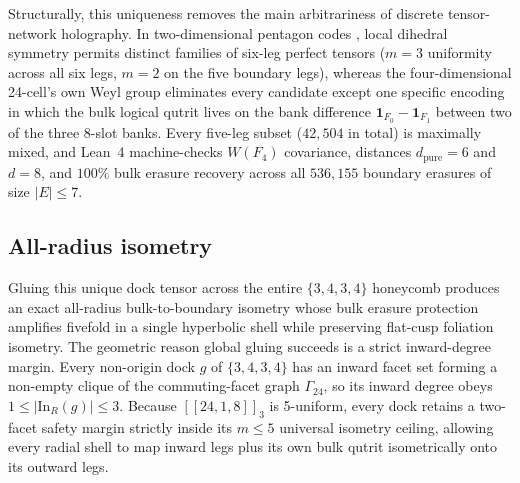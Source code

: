 Structurally, this uniqueness removes the main arbitrariness of discrete tensor-network holography. In two-dimensional
pentagon codes \cite{pastawski2015happy}, local dihedral symmetry permits distinct families of six-leg perfect tensors
($m = 3$ uniformity across all six legs, $m = 2$ on the five boundary legs), whereas the four-dimensional 24-cell's own
Weyl group eliminates every candidate except one
specific encoding in which the bulk logical qutrit lives on the bank difference $\mathbf{1}_{F_0} - \mathbf{1}_{F_1}$
between two of the three 8-slot banks. Every five-leg subset ($42{,}504$ in total) is maximally mixed, and Lean~4
machine-checks $W(F_4)$ covariance, distances $d_{\mathrm{pure}} = 6$ and $d = 8$, and $100\%$ bulk erasure recovery
across all $536{,}155$ boundary erasures of size $|E| \le 7$.

\subsection{All-radius isometry}

Gluing this unique dock tensor across the entire $\{3,4,3,4\}$ honeycomb produces an exact all-radius bulk-to-boundary
isometry whose bulk erasure protection amplifies fivefold in a single hyperbolic shell while preserving flat-cusp
foliation isometry. The geometric reason global gluing succeeds is a strict inward-degree margin. Every non-origin dock
$g$ of $\{3,4,3,4\}$ has an inward facet set forming a non-empty clique of the commuting-facet graph $\Gamma_{24}$, so
its inward degree obeys $1 \le |\mathrm{In}_R(g)| \le 3$. Because $[[24, 1, 8]]_3$ is 5-uniform, every dock retains a
two-facet safety margin strictly inside its $m \le 5$ universal isometry ceiling, allowing every radial shell to map
inward legs plus its own bulk qutrit isometrically onto its outward legs.

